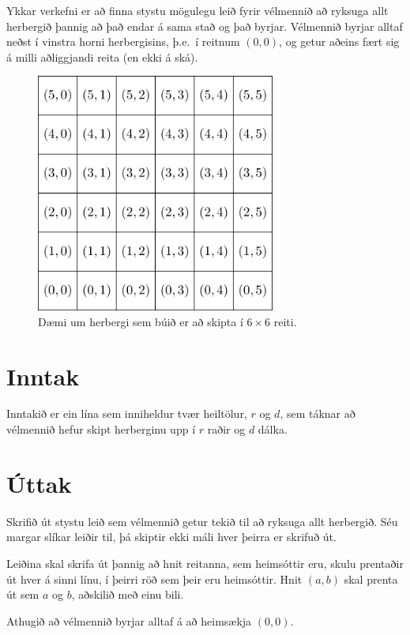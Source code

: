 Ykkar verkefni er að finna stystu mögulegu leið fyrir vélmennið að ryksuga allt
herbergið þannig að það endar á sama stað og það byrjar. Vélmennið byrjar
alltaf neðst í vinstra horni herbergisins, þ.e.\ í reitnum $(0,0)$, og getur
aðeins fært sig á milli aðliggjandi reita (en ekki á ská).

\begin{figure}[h!]
    \centering
    \includegraphics[width=0.7\textwidth]{layout.png}
    \caption{Dæmi um herbergi sem búið er að skipta í $6 \times 6$ reiti.} \label{fig:layout}
\end{figure}


\section*{Inntak}
Inntakið er ein lína sem inniheldur tvær heiltölur, $r$ og $d$, sem táknar að
vélmennið hefur skipt herberginu upp í $r$ raðir og $d$ dálka.


\section*{Úttak}
Skrifið út stystu leið sem vélmennið getur tekið til að ryksuga allt herbergið.
Séu margar slíkar leiðir til, þá skiptir ekki máli hver þeirra er skrifuð
út.

Leiðina skal skrifa út þannig að hnit reitanna, sem heimsóttir eru, skulu
prentaðir út hver á sinni línu, í þeirri röð sem þeir eru heimsóttir. Hnit
$(a,b)$ skal prenta út sem $a$ og $b$, aðskilið með einu bili.

Athugið að vélmennið byrjar alltaf á að heimsækja $(0,0)$.



